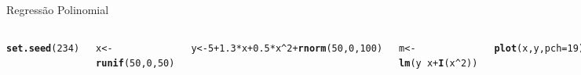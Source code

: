 \documentclass{beamer}\usepackage[]{graphicx}\usepackage[]{color}
\makeatletter
\newcommand{\hlnum}[1]{\textcolor[rgb]{0.686,0.059,0.569}{#1}}%
\newcommand{\hlstr}[1]{\textcolor[rgb]{0.192,0.494,0.8}{#1}}%
\newcommand{\hlopt}[1]{\textcolor[rgb]{0,0,0}{#1}}%
\newcommand{\hlstd}[1]{\textcolor[rgb]{0.345,0.345,0.345}{#1}}%
\newcommand{\hlkwb}[1]{\textcolor[rgb]{0.69,0.353,0.396}{#1}}%
\newcommand{\hlkwc}[1]{\textcolor[rgb]{0.333,0.667,0.333}{#1}}%
\newcommand{\hlkwd}[1]{\textcolor[rgb]{0.737,0.353,0.396}{\textbf{#1}}}%
\newenvironment{kframe}{%
 \def\at@end@of@kframe{}%
 \ifinner\ifhmode%
  \def\at@end@of@kframe{\end{minipage}}%
  \begin{minipage}{\columnwidth}%
 \fi\fi%
 \def\FrameCommand##1{\hskip\@totalleftmargin \hskip-\fboxsep
 \colorbox{shadecolor}{##1}\hskip-\fboxsep
     \hskip-\linewidth \hskip-\@totalleftmargin \hskip\columnwidth}%
 \MakeFramed {\advance\hsize-\width
   \@totalleftmargin\z@ \linewidth\hsize
   \@setminipage}}%
 {\par\unskip\endMakeFramed%
 \at@end@of@kframe}
\newenvironment{knitrout}{}{} %
\renewenvironment{knitrout}{\setlength{\topsep}{0mm}}{}
\makeatother
\begin{document}
\begin{frame}[fragile]{Regressão Polinomial}

\begin{columns}

\setlength{\topsep}{2pt}
\begin{knitrout}\tiny
{}\color{fgcolor}\begin{kframe}
\begin{alltt}
\hlkwd{set.seed}\hlstd{(}\hlnum{234}\hlstd{)}

\hlstd{x} \hlkwb{<-} \hlkwd{runif}\hlstd{(}\hlnum{50}\hlstd{,}\hlnum{0}\hlstd{,}\hlnum{50}\hlstd{)}

\hlstd{y} \hlkwb{<-} \hlnum{5} \hlopt{+} \hlnum{1.3}\hlopt{*}\hlstd{x} \hlopt{+} \hlnum{0.5}\hlopt{*}\hlstd{x}\hlopt{^}\hlnum{2} \hlopt{+} \hlkwd{rnorm}\hlstd{(}\hlnum{50}\hlstd{,}\hlnum{0}\hlstd{,}\hlnum{100}\hlstd{)}

\hlstd{m} \hlkwb{<-} \hlkwd{lm}\hlstd{(y} \hlopt{~} \hlstd{x} \hlopt{+} \hlkwd{I}\hlstd{(x}\hlopt{^}\hlnum{2}\hlstd{))}

\hlkwd{plot}\hlstd{(x,y,} \hlkwc{pch}\hlstd{=}\hlnum{19}\hlstd{)}

\hlstd{xnovo} \hlkwb{<-} \hlkwd{data.frame}\hlstd{(} \hlkwc{x} \hlstd{=} \hlkwd{seq}\hlstd{(}\hlnum{0}\hlstd{,}\hlnum{50}\hlstd{,}\hlkwc{by}\hlstd{=}\hlnum{0.5}\hlstd{))}

\hlstd{p} \hlkwb{<-} \hlkwd{predict}\hlstd{(m,xnovo)}

\hlkwd{lines}\hlstd{(xnovo[,}\hlnum{1}\hlstd{],p,} \hlkwc{lwd}\hlstd{=}\hlnum{2}\hlstd{,}\hlkwc{col}\hlstd{=}\hlstr{'red'}\hlstd{)}
\end{alltt}
\end{kframe}
\end{knitrout}



\end{columns}
\end{frame}
\end{document}
